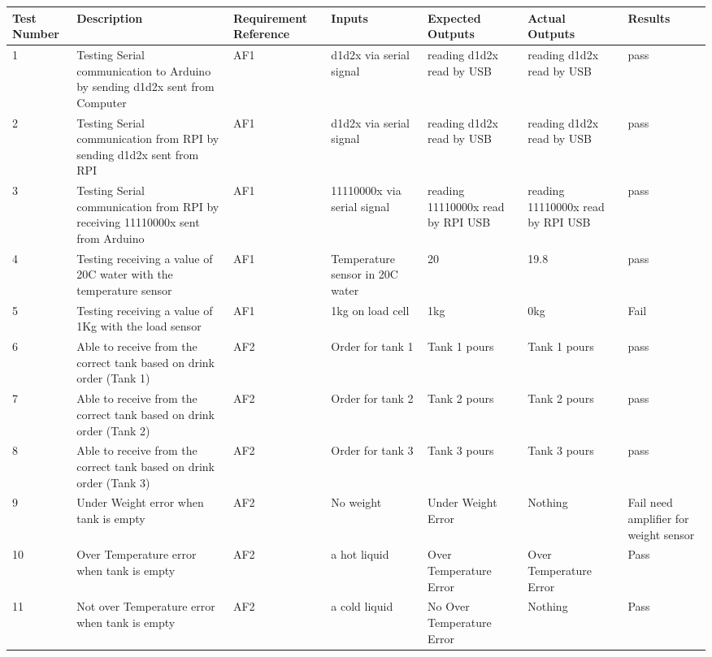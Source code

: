 \documentclass [10pt]{article}
\begin{document}
	\begin{longtable}{| p{} | p{} | p{} | p{} | p{} | p{} | p{} |}\hline 
		\rowcolor{tableCell}\textbf{Test Number} & \textbf{Description} & \textbf{Requirement Reference} & \textbf{Inputs} & \textbf{Expected Outputs} & \textbf{Actual Outputs}& \textbf{Results} \\ \hline
		1 &  Testing Serial communication to Arduino by sending d1d2x sent from Computer &  AF1 &  d1d2x via serial signal &  reading d1d2x read by USB & reading d1d2x read by USB &  pass
		\\ \hline  
		2 &  Testing Serial communication from RPI by sending d1d2x sent from RPI &  AF1 & d1d2x via serial signal &  reading d1d2x read by USB & reading d1d2x read by USB &  pass
		\\ \hline  
		3 &  Testing Serial communication from RPI by receiving 11110000x sent from Arduino & AF1& 11110000x via serial signal & reading 11110000x read by RPI USB & reading 11110000x read by RPI USB &  pass
		\\ \hline  
		4 &  Testing receiving a value of 20C water with the temperature sensor &  AF1 & Temperature sensor in 20C water &  20 &  19.8 &  pass
		\\ \hline  
		5 &  Testing receiving a value of 1Kg with the load sensor &  AF1 &  1kg on load cell  & 1kg &  0kg &  Fail \\ \hline  
		6 &  Able to receive from the correct tank based on drink order (Tank 1) &  AF2 &  Order for tank 1 &  Tank  1 pours &  Tank 1 pours &  pass
		\\ \hline  
		7 &  Able to receive from the correct tank based on drink order (Tank 2) &  AF2 &  Order for tank 2 &  Tank  2 pours &  Tank 2 pours &  pass
		\\ \hline  
		8 &  Able to receive from the correct tank based on drink order (Tank 3) &  AF2 &  Order for tank 3 &  Tank  3 pours &  Tank 3 pours &  pass
		\\ \hline  
		9 &  Under Weight error when tank is empty &  AF2 &  No weight &  Under Weight Error &  Nothing  &  Fail need amplifier for weight sensor
		\\ \hline  
		10 &  Over Temperature error when tank is empty &  AF2 &  a hot liquid &  Over Temperature Error &  Over Temperature Error &  Pass
		\\ \hline  
		11 &  Not over Temperature error when tank is empty &  AF2 &  a cold liquid &  No Over Temperature Error &  Nothing &  Pass \\ \hline  
	\end{longtable}
\newpage
\end{document}
